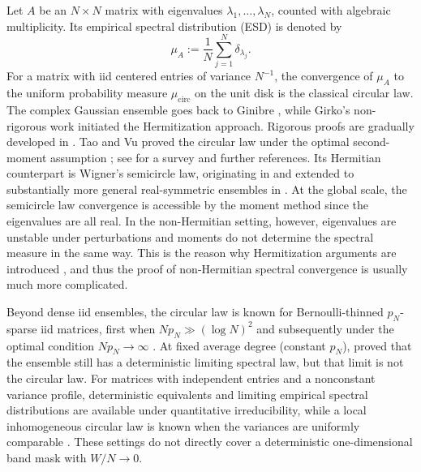 \documentclass[11pt,reqno]{amsart}
\numberwithin{equation}{section}
\theoremstyle{definition}
\theoremstyle{remark}
\newcommand{\1}{\mathbf 1}
\newcommand{\cir}{\mathrm{circ}}
\begin{document}
Let \(A\) be an \(N\times N\) matrix with eigenvalues
\(\lambda_1,\ldots,\lambda_N\), counted with algebraic multiplicity.  Its
empirical spectral distribution (ESD) is denoted by
\[
 \mu_A:=\frac1N\sum_{j=1}^N\delta_{\lambda_j}.
\]
For a matrix with iid centered entries of variance \(N^{-1}\), the
convergence of \(\mu_A\) to the uniform probability measure
\(\mu_{\cir}\) on the unit disk is the classical circular law.  The
complex Gaussian ensemble goes
back to Ginibre \cite{Ginibre1965}, while Girko's non-rigorous work
\cite{Girko1985} initiated the Hermitization approach.  Rigorous proofs are gradually developed in \cite{Bai1997,GotzeTikhomirov2010,PanZhou2010}.
Tao and Vu proved the circular law under the optimal second-moment
assumption \cite{TaoVuKrishnapur2010}; see
\cite{BordenaveChafai2012} for a survey and further references.  Its
Hermitian counterpart is Wigner's semicircle law, originating in
\cite{Wigner1955CharacteristicVectors} and extended to substantially
more general real-symmetric ensembles in
\cite{Wigner1958RootsSymmetricMatrices}.  At the global scale, the
semicircle law convergence is accessible by the moment method since the eigenvalues are all real.  In the
non-Hermitian setting, however, eigenvalues are unstable under
perturbations and moments do not determine the spectral measure in the
same way. This is the reason why Hermitization arguments are introduced \cite{Girko1985}, and thus the proof of non-Hermitian spectral convergence is usually much more complicated.

Beyond dense iid ensembles, the circular law is known for
Bernoulli-thinned $p_N$-sparse iid matrices, first when
\(Np_N\gg(\log N)^2\) and subsequently under the optimal condition
\(Np_N\to\infty\)
\cite{BasakRudelson2019,RudelsonTikhomirov2019}.  At fixed average
degree (constant $p_N$),
\cite{SahSahasrabudheSawhney2025} proved that the ensemble still has a deterministic limiting
spectral law, but that limit is not the circular law.  For matrices with
independent entries and a nonconstant variance profile, deterministic
equivalents and limiting empirical spectral distributions are available
under quantitative irreducibility, while a local inhomogeneous circular
law is known when the variances are uniformly comparable
\cite{CookHachemNajimRenfrew2018,CookHachemNajimRenfrew2022,
AltErdosKruger2018}.  These settings do not directly cover a
deterministic one-dimensional band mask with \(W/N\to0\).
\end{document}
